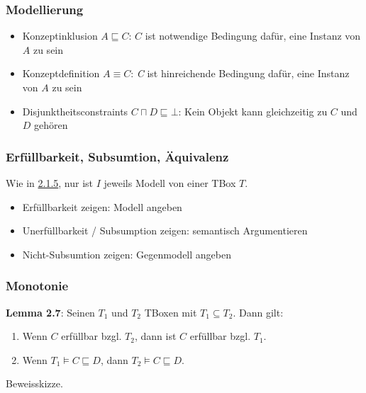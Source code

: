 \subsubsection{Modellierung}\label{modellierung}

\begin{itemize}
\item
  Konzeptinklusion $A \sqsubseteq C$: $C$ ist notwendige Bedingung
  dafür, eine Instanz von $A$ zu sein
\item
  Konzeptdefinition $A \equiv C$: \emph{C} ist hinreichende Bedingung
  dafür, eine Instanz von $A$ zu sein
\item
  Disjunktheitsconstraints $C \sqcap D \sqsubseteq \bot$: Kein Objekt
  kann gleichzeitig zu $C$ und $D$ gehören
\end{itemize}

\subsubsection{Erfüllbarkeit, Subsumtion,
Äquivalenz}\label{erfuxfcllbarkeit-subsumtion-uxe4quivalenz-1}

Wie in
\protect\hyperlink{erfuxfcllbarkeit-subsumtion-uxe4quivalenz}{2.1.5},
nur ist $I$ jeweils Modell von einer TBox $T$.

\begin{itemize}
\item
  Erfüllbarkeit zeigen: Modell angeben
\item
  Unerfüllbarkeit / Subsumption zeigen: semantisch Argumentieren
\item
  Nicht-Subsumtion zeigen: Gegenmodell angeben
\end{itemize}

\subsubsection{Monotonie}\label{monotonie}

\textbf{Lemma 2.7}: Seinen $T_{1}$ und $T_{2}$ TBoxen mit
$T_{1} \subseteq T_{2}$. Dann gilt:

\begin{enumerate}
\def\labelenumi{\arabic{enumi}.}
\item
  Wenn $C$ erfüllbar bzgl. $T_{2}$, dann ist $C$ erfüllbar bzgl.
  $T_{1}$.
\item
  Wenn $T_{1} \vDash C \sqsubseteq D$, dann
  $T_{2} \vDash C \sqsubseteq D$.
\end{enumerate}

Beweisskizze.

